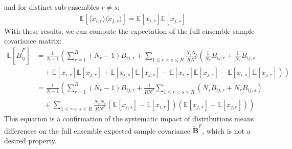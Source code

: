 \documentclass[12pt]{scrartcl}
\begin{document}
and for distinct sub-ensembles $r \ne s$:
\begin{align}
\mathbb{E} \left[\langle \widetilde{x}_{i,r} \rangle \langle \widetilde{x}_{j,s} \rangle\right] = \mathbb{E} \left[x_{i,r}\right] \mathbb{E} \left[x_{j,s}\right]
\end{align}
With these results, we can compute the expectation of the full ensemble sample covariance matrix:
\begin{align}
\mathbb{E} \left[\widetilde{B}^F_{ij}\right] & = \frac{1}{N-1} \left(\sum_{r=1}^R \left(N_r-1\right) B_{ij,r} + \sum_{1 \le r < s \le R} \frac{N_r N_s}{R N^2} \left(\frac{1}{N_r} B_{ij,r} + \frac{1}{N_s} B_{ij,s} \right. \right.\nonumber \\
& \left. \left. \quad + \mathbb{E} \left[x_{i,r} \right] \mathbb{E} \left[x_{j,r} \right] + \mathbb{E} \left[x_{i,s} \right] \mathbb{E} \left[x_{j,s} \right] - \mathbb{E} \left[x_{i,r}\right] \mathbb{E} \left[x_{j,s}\right] - \mathbb{E} \left[x_{i,s}\right] \mathbb{E} \left[x_{j,r}\right] \right) \right) \nonumber \\
& = \frac{1}{N-1} \left(\sum_{r=1}^R \left(N_r-1\right) B_{ij,r} + \frac{1}{R N^2} \sum_{1 \le r < s \le R} \left(N_s B_{ij,r} + N_r B_{ij,s}\right) \right. \nonumber \\
& \left. \quad + \sum_{1 \le r < s \le R} \frac{N_r N_s}{R N^2} \left(\mathbb{E} \left[x_{i,s} \right] - \mathbb{E} \left[x_{i,r} \right]\right)\left(\mathbb{E} \left[x_{j,s} \right] - \mathbb{E} \left[x_{j,r} \right] \right)\right)
\end{align}
This equation is a confirmation of the systematic impact of distributions means differences on the full ensemble expected sample covariance $\widetilde{\mathbf{B}}^F$, which is not a desired property.
\end{document}
